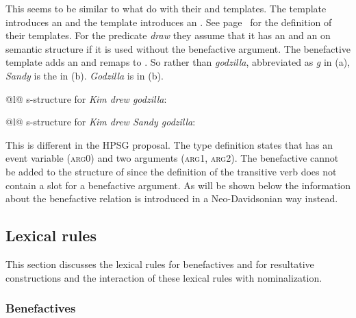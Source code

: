 This seems to be similar to what \citet{AGT2014a} do with their
 and  templates. The  template introduces an
\argone and the  template introduces an \argtwo. See page~\pageref{ex:agent-temp} for the
definition of their templates. For the predicate \emph{draw} they assume that it has an \argone and
an \argtwo on semantic structure if it is used without the benefactive argument. The benefactive
template adds an \argthree and remaps \argtwo to \argthree. So rather than \emph{godzilla}, abbreviated as
\textit{g} in (a), \emph{Sandy} is the \argtwo in (b). \emph{Godzilla} is \argthree in
(b).
\eal
\ex 
\begin{tabular}[t]{@{}l@{}}
s-structure for \emph{Kim drew godzilla}:\\ 
\end{tabular}
\ex
\begin{tabular}[t]{@{}l@{}}
s-structure for \emph{Kim drew Sandy godzilla}:\\
\end{tabular}
\zl
This is different in the HPSG proposal. The type definition states that  has an event
variable (\textsc{arg0}) and two arguments (\textsc{arg1}, \textsc{arg2}). The benefactive cannot be added to the
structure of  since the definition of the transitive verb  does not contain a slot for a benefactive argument. As will be shown below
the information about the benefactive relation is introduced in a Neo-Davidsonian way instead.   

\subsection{Lexical rules}

This section discusses the lexical rules for benefactives and for resultative constructions and the
interaction of these lexical rules with nominalization.

\subsubsection{Benefactives}

